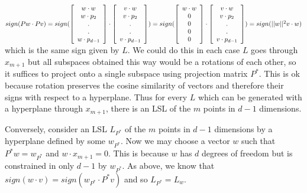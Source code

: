 \documentclass[]{article}
\begin{document}
$sign(Pw \cdot Pv) = 
sign(
\left[
\begin{array}{c}
w \cdot w \\
w \cdot p_2\\
.\\
.\\
w \cdot p_{d-1}\\
\end{array}
\right]
\cdot
\left[
\begin{array}{c}
v \cdot w \\
v \cdot p_2\\
.\\
.\\
v \cdot p_{d-1}\\
\end{array}\\
\right]
)\\
=
sign(
\left[
\begin{array}{c}
w \cdot w \\
0\\
0\\
0\\
0
\end{array}
\right]
\cdot
\left[
\begin{array}{c}
v \cdot w \\
v \cdot p_2\\
.\\
.\\
v \cdot p_{d-1}\\
\end{array}
\right])\\
= sign(||w||^2 v \cdot w)
$\\
which is the same sign given by $L$. We could do this in each case $L$ goes through $x_{m+1}$ but all subspaces obtained this way would be a rotations of each other, so it suffices to project onto a single subspace using projection matrix $P^*$. This is ok because rotation preserves the cosine similarity of vectors and therefore their signs with respect to a hyperplane. Thus for every $L$ which can be generated with a hyperplane through $x_{m+1}$, there is an LSL of the $m$ points in $d-1$ dimensions.

Conversely, consider an LSL $L_{P^*}$ of the $m$ points in $d-1$ dimensions by a hyperplane defined by some $w_{P^*}$. Now we may choose a vector $w$ such that $P^* w = w_{P^*}$ and $w \cdot x_{m+1} = 0$. This is because $w$ has $d$ degrees of freedom but is constrained in only $d-1$ by $w_{P^*}$. As above, we know that $sign(w \cdot v) = sign(w_{P^*} \cdot P^*v)$ and so $L_{P^*} = L_{w}$.
\end{document}
